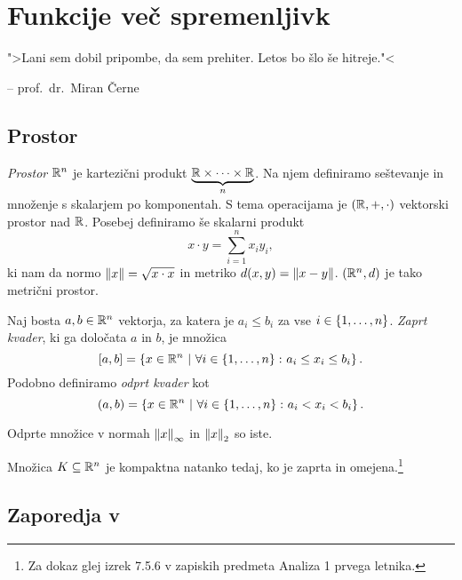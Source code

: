 \section{Funkcije več spremenljivk}

\epigraph{">Lani sem dobil pripombe, da sem prehiter. Letos bo šlo še hitreje."<}{-- prof.~dr.~Miran Černe}

\subsection{Prostor }


\begin{definicija}
\emph{Prostor $\mathbb{R}^n$} je kartezični produkt
$\underbrace{\mathbb{R} \times \dots \times \mathbb{R}}_n$. Na njem definiramo
seštevanje in množenje s skalarjem po komponentah. S tema
operacijama je $(\mathbb{R},+,\cdot)$ vektorski prostor nad $\mathbb{R}$. Posebej
definiramo še skalarni produkt
\[
x \cdot y = \sum_{i=1}^n x_iy_i,
\]
ki nam da normo $\left\lVert x\right\rVert=\sqrt{x \cdot x}$ in metriko
$d(x,y) = \left\lVert x-y\right\rVert$. $(\mathbb{R}^n,d)$ je tako metrični prostor.
\end{definicija}

\begin{definicija}
Naj bosta $a,b \in \mathbb{R}^n$ vektorja, za katera je $a_i \leq b_i$ za
vse $i \in \left\{1,\dots,n\right\}$. \emph{Zaprt kvader}, ki
ga določata $a$ in $b$, je množica
\[
[a,b] = \left\{x\in\mathbb{R}^n~\middle\vert~\forall i \in \left\{1,\dots,n\right\} \colon
a_i \leq x_i \leq b_i\right\}.
\]
Podobno definiramo \emph{odprt kvader} kot
\[
(a,b) = \left\{x\in\mathbb{R}^n~\middle\vert~\forall i \in \left\{1,\dots,n\right\} \colon
a_i < x_i < b_i\right\}.
\]
\end{definicija}

\begin{opomba}
Odprte množice v normah $\left\lVert x\right\rVert_\infty$ in $\left\lVert x\right\rVert_2$ so iste.
\end{opomba}

\begin{izrek}
Množica $K\subseteq\mathbb{R}^n$ je kompaktna natanko tedaj, ko je zaprta
in omejena.\footnote{Za dokaz glej izrek 7.5.6 v zapiskih predmeta
Analiza 1 prvega letnika.}
\end{izrek}

\newpage

\subsection{Zaporedja v }

